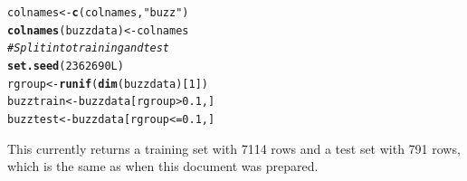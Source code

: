 \documentclass{article}\usepackage[]{graphicx}\usepackage[]{color}
\makeatletter
\newcommand{\hlnum}[1]{\textcolor[rgb]{0.686,0.059,0.569}{#1}}%
\newcommand{\hlstr}[1]{\textcolor[rgb]{0.192,0.494,0.8}{#1}}%
\newcommand{\hlcom}[1]{\textcolor[rgb]{0.678,0.584,0.686}{\textit{#1}}}%
\newcommand{\hlopt}[1]{\textcolor[rgb]{0,0,0}{#1}}%
\newcommand{\hlstd}[1]{\textcolor[rgb]{0.345,0.345,0.345}{#1}}%
\newcommand{\hlkwb}[1]{\textcolor[rgb]{0.69,0.353,0.396}{#1}}%
\newcommand{\hlkwd}[1]{\textcolor[rgb]{0.737,0.353,0.396}{\textbf{#1}}}%
\newenvironment{kframe}{%
 \def\at@end@of@kframe{}%
 \ifinner\ifhmode%
  \def\at@end@of@kframe{\end{minipage}}%
  \begin{minipage}{\columnwidth}%
 \fi\fi%
 \def\FrameCommand##1{\hskip\@totalleftmargin \hskip-\fboxsep
 \colorbox{shadecolor}{##1}\hskip-\fboxsep
     \hskip-\linewidth \hskip-\@totalleftmargin \hskip\columnwidth}%
 \MakeFramed {\advance\hsize-\width
   \@totalleftmargin\z@ \linewidth\hsize
   \@setminipage}}%
 {\par\unskip\endMakeFramed%
 \at@end@of@kframe}
\newenvironment{knitrout}{}{} %
\makeatother
\begin{document}
\begin{knitrout}
\begin{kframe}
\begin{alltt}
\hlstd{colnames} \hlkwb{<-}  \hlkwd{c}\hlstd{(colnames,} \hlstr{"buzz"}\hlstd{)}
\hlkwd{colnames}\hlstd{(buzzdata)} \hlkwb{<-} \hlstd{colnames}
\hlcom{# Split into training and test}
\hlkwd{set.seed}\hlstd{(}\hlnum{2362690L}\hlstd{)}
\hlstd{rgroup} \hlkwb{<-} \hlkwd{runif}\hlstd{(}\hlkwd{dim}\hlstd{(buzzdata)[}\hlnum{1}\hlstd{])}
\hlstd{buzztrain} \hlkwb{<-} \hlstd{buzzdata[rgroup} \hlopt{>} \hlnum{0.1}\hlstd{,]}
\hlstd{buzztest} \hlkwb{<-} \hlstd{buzzdata[rgroup} \hlopt{<=}\hlnum{0.1}\hlstd{,]}
\end{alltt}
\end{kframe}
\end{knitrout}


This currently returns a training set with 7114 rows and a test set with 
791 rows, which 
is the same
as when this document was prepared.
\end{document}
